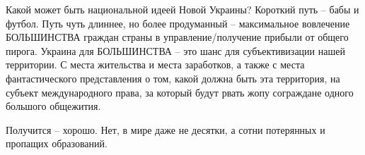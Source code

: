 Какой может быть национальной идеей Новой Украины? Короткий путь – бабы и
футбол. Путь чуть длиннее, но более продуманный – максимальное вовлечение
БОЛЬШИНСТВА граждан страны в управление/получение прибыли от общего пирога.
Украина для БОЛЬШИНСТВА – это шанс для субъективизации нашей территории. С
места жительства и места заработков, а также с места фантастического
представления о том, какой должна быть эта территория, на субъект
международного права, за который будут рвать жопу сограждане одного большого
общежития.

Получится – хорошо. Нет, в мире даже не десятки, а сотни потерянных и пропащих
образований.

